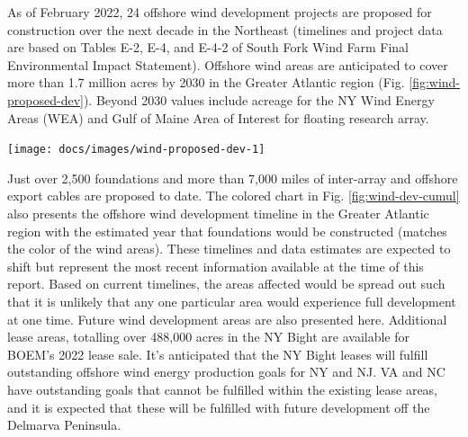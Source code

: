 \documentclass[
  10pt,
]{article}
\let\origfigure\figure
\let\endorigfigure\endfigure
\renewenvironment{figure}[1][2] {
    \expandafter\origfigure\expandafter[H]
} {
    \endorigfigure
}
\begin{document}
As of February 2022, 24 offshore wind development projects are proposed
for construction over the next decade in the Northeast (timelines and
project data are based on Tables E-2, E-4, and E-4-2 of South Fork Wind
Farm Final Environmental Impact Statement). Offshore wind areas are
anticipated to cover more than 1.7 million acres by 2030 in the Greater
Atlantic region (Fig. \ref{fig:wind-proposed-dev}). Beyond 2030 values
include acreage for the NY Wind Energy Areas (WEA) and Gulf of Maine
Area of Interest for floating research array.

\begin{figure}

{\centering \texttt{[image: docs/images/wind-proposed-dev-1]} 

}

\caption{Proposed wind development on the northeast shelf.}\label{fig:wind-proposed-dev}
\end{figure}

Just over 2,500 foundations and more than 7,000 miles of inter-array and
offshore export cables are proposed to date. The colored chart in Fig.
\ref{fig:wind-dev-cumul} also presents the offshore wind development
timeline in the Greater Atlantic region with the estimated year that
foundations would be constructed (matches the color of the wind areas).
These timelines and data estimates are expected to shift but represent
the most recent information available at the time of this report. Based
on current timelines, the areas affected would be spread out such that
it is unlikely that any one particular area would experience full
development at one time. Future wind development areas are also
presented here. Additional lease areas, totalling over 488,000 acres in
the NY Bight are available for BOEM's 2022 lease sale. It's anticipated
that the NY Bight leases will fulfill outstanding offshore wind energy
production goals for NY and NJ. VA and NC have outstanding goals that
cannot be fulfilled within the existing lease areas, and it is expected
that these will be fulfilled with future development off the Delmarva
Peninsula.
\end{document}
